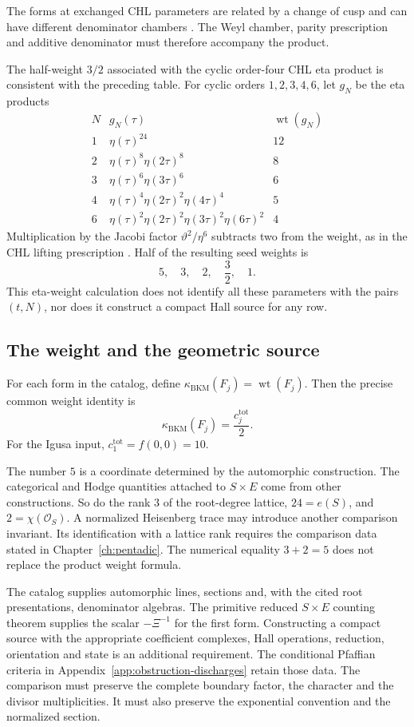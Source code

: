 The forms at exchanged CHL parameters are related by a change of
cusp and can have different denominator chambers
\cite[(3.12), \S4]{Gov11BKM}.
The Weyl chamber, parity prescription and additive denominator must
therefore accompany the product.

The half-weight \(3/2\) associated with the cyclic order-four CHL
eta product is consistent with the preceding table.
For cyclic orders \(1,2,3,4,6\), let \(g_N\) be the eta products
\[
\begin{array}{c|l|c}
 N&g_N(\tau)&\operatorname{wt}(g_N)\\ \hline
 1&\eta(\tau)^{24}&12\\
 2&\eta(\tau)^8\eta(2\tau)^8&8\\
 3&\eta(\tau)^6\eta(3\tau)^6&6\\
 4&\eta(\tau)^4\eta(2\tau)^2\eta(4\tau)^4&5\\
 6&\eta(\tau)^2\eta(2\tau)^2\eta(3\tau)^2\eta(6\tau)^2&4
\end{array}
\]
Multiplication by the Jacobi factor \(\vartheta^2/\eta^6\)
subtracts two from the weight, as in the CHL lifting prescription
\cite[Table 1 and \S3.2]{GK10Composite}.
Half of the resulting seed weights is
\[
 5,\quad3,\quad2,\quad\frac32,\quad1.
\]
This eta-weight calculation does not identify all these parameters
with the pairs \((t,N)\), nor does it construct a compact Hall
source for any row.

\subsection{The weight and the geometric source}

For each form in the catalog, define
\(\kappa_{\mathrm{BKM}}(F_j)=\operatorname{wt}(F_j)\).
Then the precise common weight identity is
\[
 \kappa_{\mathrm{BKM}}(F_j)=\frac{c_j^{\mathrm{tot}}}{2}.
\]
For the Igusa input, \(c_1^{\mathrm{tot}}=f(0,0)=10\).

The number \(5\) is a coordinate determined by the automorphic
construction.
The categorical and Hodge quantities attached to \(S\times E\)
come from other constructions.
So do the rank \(3\) of the root-degree lattice,
\(24=e(S)\), and \(2=\chi(\mathcal O_S)\).
A normalized Heisenberg trace may introduce another comparison
invariant.  Its identification with a lattice rank requires the
comparison data stated in Chapter~\ref{ch:pentadic}.
The numerical equality \(3+2=5\) does not replace the product
weight formula.

The catalog supplies automorphic lines, sections and, with the
cited root presentations, denominator algebras.
The primitive reduced \(S\times E\) counting theorem supplies the
scalar \(-\Xi^{-1}\) for the first form.
Constructing a compact source with the appropriate coefficient
complexes, Hall operations, reduction, orientation and state is an
additional requirement.  The conditional Pfaffian criteria in
Appendix~\ref{app:obstruction-discharges} retain those data.
The comparison must preserve the complete boundary factor, the
character and the divisor multiplicities.
It must also preserve the exponential convention and the
normalized section.
